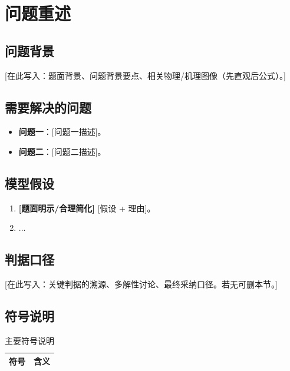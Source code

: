 \section{问题重述}

\subsection{问题背景}
[在此写入：题面背景、问题背景要点、相关物理/机理图像（先直观后公式）。]

\subsection{需要解决的问题}
\begin{itemize}
  \item \textbf{问题一}：[问题一描述]。
  \item \textbf{问题二}：[问题二描述]。
\end{itemize}

\subsection{模型假设}
\begin{enumerate}
  \item[1.] \textbf{[题面明示/合理简化]} [假设 + 理由]。
  \item[2.] ...  %
\end{enumerate}

\subsection{判据口径}  %
[在此写入：关键判据的溯源、多解性讨论、最终采纳口径。若无可删本节。]

\subsection{符号说明}
\begin{table}[H]
\centering
\caption{主要符号说明}\label{tab:symbols}
\begin{tabular}{cl}
\toprule
符号 & 含义 \\
\midrule
\bottomrule
\end{tabular}
\end{table}
